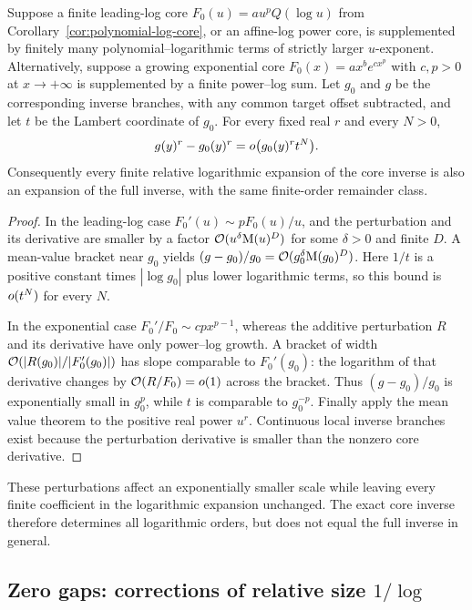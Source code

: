 \begin{proposition}
\label{prop:lambert-flat-perturbation}
Suppose a finite leading-log core $F_0(u)=a u^p Q(\log u)$ from Corollary~\ref{cor:polynomial-log-core}, or an affine-log power core, is supplemented by finitely many polynomial--logarithmic terms of strictly larger $u$-exponent. Alternatively, suppose a growing exponential core $F_0(x)=a x^b e^{c x^p}$ with $c,p>0$ at $x\to+\infty$ is supplemented by a finite power--log sum. Let $g_0$ and $g$ be the corresponding inverse branches, with any common target offset subtracted, and let $t$ be the Lambert coordinate of $g_0$. For every fixed real $r$ and every $N>0$,
\[
 g(y)^r-g_0(y)^r=o\bigl(g_0(y)^r t^N\bigr).
\]
Consequently every finite relative logarithmic expansion of the core inverse is also an expansion of the full inverse, with the same finite-order remainder class.
\end{proposition}
\begin{proof}
In the leading-log case $F_0'(u)\sim pF_0(u)/u$, and the perturbation and its derivative are smaller by a factor $\mathcal O(u^\delta\mathrm M(u)^D)$ for some $\delta>0$ and finite $D$. A mean-value bracket near $g_0$ yields $(g-g_0)/g_0=\mathcal O(g_0^\delta\mathrm M(g_0)^D)$. Here $1/t$ is a positive constant times $|\log g_0|$ plus lower logarithmic terms, so this bound is $o(t^N)$ for every $N$.

In the exponential case $F_0'/F_0\sim cp x^{p-1}$, whereas the additive perturbation $R$ and its derivative have only power--log growth. A bracket of width $\mathcal O(|R(g_0)|/|F_0'(g_0)|)$ has slope comparable to $F_0'(g_0)$: the logarithm of that derivative changes by $\mathcal O(R/F_0)=o(1)$ across the bracket. Thus $(g-g_0)/g_0$ is exponentially small in $g_0^p$, while $t$ is comparable to $g_0^{-p}$. Finally apply the mean value theorem to the positive real power $u^r$. Continuous local inverse branches exist because the perturbation derivative is smaller than the nonzero core derivative.
\end{proof}

These perturbations affect an exponentially smaller scale while leaving every finite coefficient in the logarithmic expansion unchanged. The exact core inverse therefore determines all logarithmic orders, but does not equal the full inverse in general.

\subsection{Zero gaps: corrections of relative size \texorpdfstring{$1/\log$}{1/log}}

